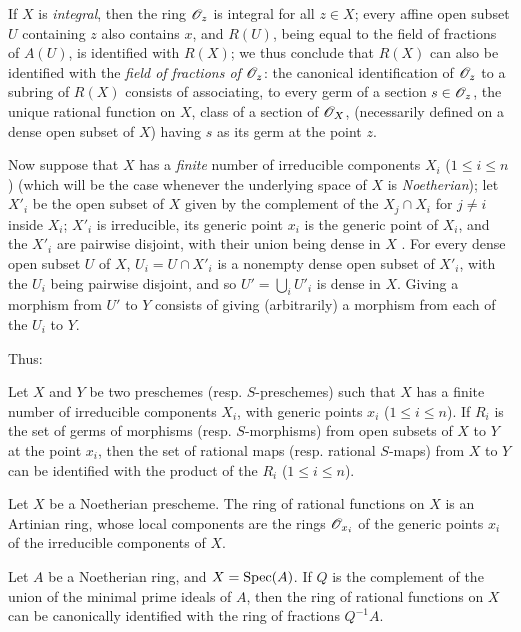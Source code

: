 If $X$ is \emph{integral}, then the ring $\mathscr{O}_z$ is integral for all $z\in X$; every affine open subset $U$ containing $z$ also contains $x$, and $R(U)$, being equal to the field of fractions of $A(U)$, is identified with $R(X)$; we thus conclude that $R(X)$ can also be identified with the \emph{field of fractions of $\mathscr{O}_z$}: the canonical identification of $\mathscr{O}_z$ to a subring of $R(X)$ consists of associating, to every germ of a section $s\in\mathscr{O}_z$, the unique rational function on $X$, class of a section of $\mathscr{O}_X$, (necessarily defined on a dense open subset of $X$) having $s$ as its germ at the point $z$.

\begin{env}[7.1.6]
\label{I.7.1.6}
Now suppose that $X$ has a \emph{finite} number of irreducible components $X_i$ ($1\leq i\leq n$) (which will be the case whenever the underlying space of $X$ is \emph{Noetherian}); let $X'_i$ be the open subset of $X$ given by the complement of the $X_j\cap X_i$ for $j\neq i$ inside $X_i$; $X'_i$ is irreducible, its generic point $x_i$ is the generic point of $X_i$, and the $X'_i$ are pairwise disjoint, with their union being dense in $X$ .
For every dense open subset $U$ of $X$, $U_i=U\cap X'_i$ is a nonempty dense open subset of $X'_i$, with the $U_i$ being pairwise disjoint, and so $U'=\bigcup_i U'_i$ is dense in $X$.
Giving a morphism from $U'$ to $Y$ consists of giving (arbitrarily) a morphism from each of the $U_i$ to $Y$.
\end{env}

Thus:
\begin{proposition}[7.1.7]
\label{I.7.1.7}
Let $X$ and $Y$ be two preschemes (resp. $S$-preschemes) such that $X$ has a finite number of irreducible components $X_i$, with generic points $x_i$ ($1\leq i\leq n$).
If $R_i$ is the set of germs of morphisms (resp. $S$-morphisms) from open subsets of $X$ to $Y$ at the point $x_i$, then the set of rational maps (resp. rational $S$-maps) from $X$ to $Y$ can be identified with the product of the $R_i$ ($1\leq i\leq n$).
\end{proposition}

\begin{corollary}[7.1.8]
\label{I.7.1.8}
Let $X$ be a Noetherian prescheme.
The ring of rational functions on $X$ is an Artinian ring, whose local components are the rings $\mathscr{O}_{x_i}$ of the generic points $x_i$ of the irreducible components of $X$.
\end{corollary}

\begin{corollary}[7.1.9]
\label{I.7.1.9}
Let $A$ be a Noetherian ring, and $X=\operatorname{Spec}(A)$.
If $Q$ is the complement of the union of the minimal prime ideals of $A$, then the ring of rational functions on $X$ can be canonically identified with the ring of fractions $Q^{-1}A$.
\end{corollary}

